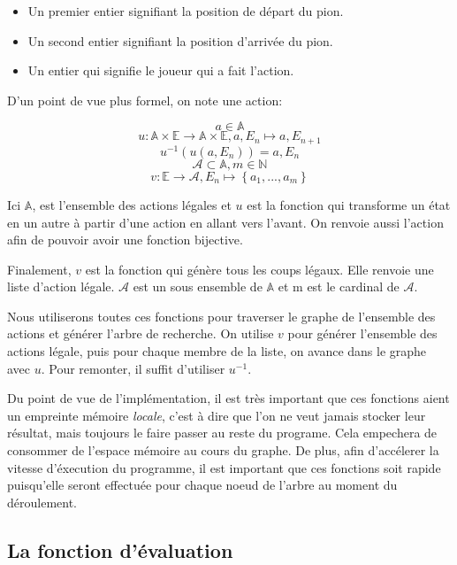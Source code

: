 \documentclass[a4paper,11pt]{article}
\begin{document}
\begin{multicols}{2}[]
    \begin{itemize}
      \item Un premier entier signifiant la position de départ du pion.
      \item Un second entier signifiant la position d'arrivée du pion.
      \item Un entier qui signifie le joueur qui a fait l'action.
    \end{itemize}

    D'un point de vue plus formel, on note une action:

    \[  a \in \mathbb{A} \]
    \[ u : \mathbb{A} \times \mathbb{E} \to \mathbb{A} \times \mathbb{E}, 
        a, E_{n} \mapsto a, E_{n+1} \]
    \[ u^{-1}(u(a, E_{n})) = a, E_{n} \]
    \[ \mathcal{A} \subset \mathbb{A}, m \in \mathbb{N} \]
    \[ v : \mathbb{E} \to \mathcal{A},
        E_{n} \mapsto \left\{ a_{1}, ..., a_{m} \right\} \]

    Ici $\mathbb{A}$, est l'ensemble des actions légales et $u$ est la fonction
    qui transforme un état en un autre à partir d'une action en allant vers
    l'avant. On renvoie aussi l'action afin de pouvoir avoir une fonction
    bijective.

    Finalement, $v$ est la fonction qui génère tous les coups légaux. Elle
    renvoie une liste d'action légale. $\mathcal{A}$ est un sous ensemble de 
    $\mathbb{A}$ et m est le cardinal de $\mathcal{A}$.
    
    Nous utiliserons toutes ces fonctions pour traverser le graphe de l'ensemble
    des actions et générer l'arbre de recherche. On utilise $v$ pour générer
    l'ensemble des actions légale, puis pour chaque membre de la liste, on
    avance dans le graphe avec $u$. Pour remonter, il suffit d'utiliser
    $u^{-1}$.

    Du point de vue de l'implémentation, il est très important que ces fonctions
    aient un empreinte mémoire \emph{locale}, c'est à dire que l'on ne veut
    jamais stocker leur résultat, mais toujours le faire passer au reste du
    programe. Cela empechera de consommer de l'espace mémoire au cours du
    graphe. De plus, afin d'accélerer la vitesse d'éxecution du programme, il
    est important que ces fonctions soit rapide puisqu'elle seront effectuée
    pour chaque noeud de l'arbre au moment du déroulement.

  \subsection{La fonction d'évaluation}


\end{multicols}
\end{document}
